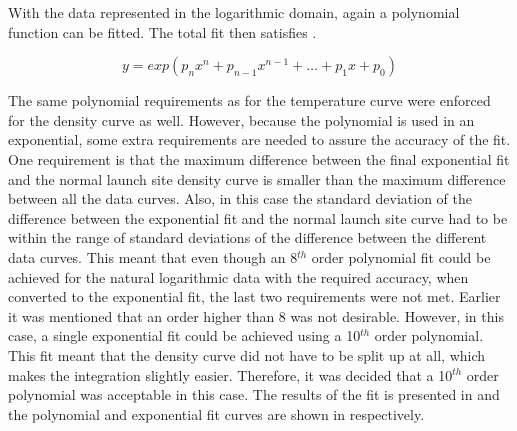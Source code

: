 With the data represented in the logarithmic domain, again a polynomial function can be fitted. The total fit then satisfies .

\begin{equation} \label{eq:expPoly}
y=exp\left( p_{n}x^{n}+p_{n-1}x^{n-1}+\dots+p_{1}x+p_{0}\right)
\end{equation}



%

\noindent
The same polynomial requirements as for the temperature curve were enforced for the density curve as well. However, because the polynomial is used in an exponential, some extra requirements are needed to assure the accuracy of the fit. One requirement is that the maximum difference between the final exponential fit and the normal launch site density curve is smaller than the maximum difference between all the data curves. Also, in this case the standard deviation of the difference between the exponential fit and the normal launch site curve had to be within the range of standard deviations of the difference between the different data curves. This meant that even though an 8$^{th}$ order polynomial fit could be achieved for the natural logarithmic data with the required accuracy, when converted to the exponential fit, the last two requirements were not met. Earlier it was mentioned that an order higher than 8 was not desirable. However, in this case, a single exponential fit could be achieved using a 10$^{th}$ order polynomial. This fit meant that the density curve did not have to be split up at all, which makes the integration slightly easier. Therefore, it was decided that a 10$^{th}$ order polynomial was acceptable in this case. The results of the fit is presented in  and the polynomial and exponential fit curves are shown in  respectively.

